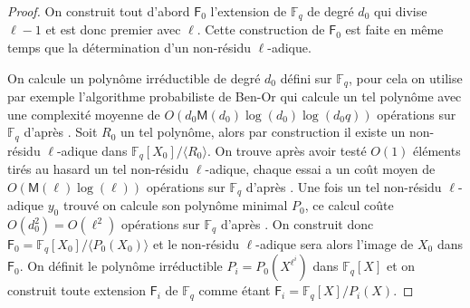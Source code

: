 \documentclass[10pt,a4paper]{book}
\theoremstyle{plain}
\theoremstyle{definition}
\theoremstyle{definition}
\theoremstyle{definition}
\theoremstyle{definition}
\theoremstyle{remark}
\newtheorem{rem}[thm]{Remarque}
\theoremstyle{remark}
\begin{document}
 \begin{proof}
  On construit tout d'abord $\mathsf{F}_0$ l'extension de $\mathbb{F}_q$ de degré $d_0$ qui divise $\ell-1$ et est donc premier avec $\ell$. Cette construction de $\mathsf{F}_0$ est faite en même temps que la détermination d'un non-résidu $\ell$-adique. 

On calcule un polynôme irréductible de degré $d_0$ défini sur $\mathbb{F}_q$, pour cela on utilise par exemple l'algorithme probabiliste de Ben-Or qui calcule un tel polynôme avec une complexité moyenne de $O(d_0\mathsf{M}(d_0)\log(d_0)\log(d_0q))$ opérations sur $\mathbb{F}_q$ d'après \cite[Theorem 14.42]{vzGJG03}.
 Soit $R_0$ un tel polynôme, alors par construction il existe un non-résidu $\ell$-adique dans $\mathbb{F}_q[X_0]/ \langle R_0 \rangle $. On trouve après avoir testé $O(1)$ éléments tirés au hasard un tel non-résidu $\ell$-adique, chaque essai a un coût moyen de $O(\mathsf{M}(\ell)\log(\ell))$ opérations sur $\mathbb{F}_q$ d'après \cite[11.1]{vzGJG03}. Une fois un tel non-résidu $\ell$-adique $y_0$ trouvé on calcule son polynôme minimal $P_0$, ce calcul coûte $O(d_0^2)=O(\ell^2)$ opérations sur $\mathbb{F}_q$ d'après \cite[Th. 3.4]{Shoup93}. On construit donc $\mathsf{F}_0=\mathbb{F}_q[X_0]/\langle P_0(X_0) \rangle$ et le non-résidu $\ell$-adique sera alors l'image de $X_0$ dans $\mathsf{F}_0$. On définit le polynôme irréductible $P_i=P_0(X^{\ell^{i}})$ dans $\mathbb{F}_q[X]$ et on construit toute extension $\mathsf{F}_{i}$ de $\mathbb{F}_{q}$ comme étant $\mathsf{F}_{i}=\mathbb{F}_q[X]/P_i(X)$. 
 
\end{proof}

\end{document}
